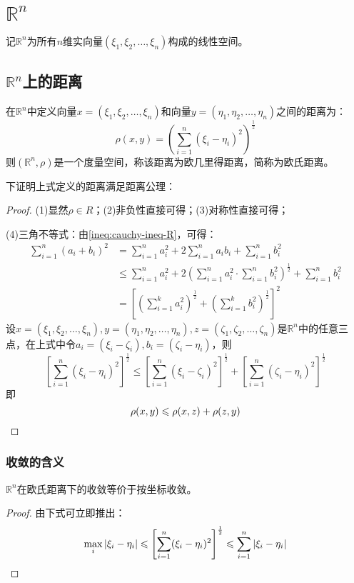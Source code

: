 \section{$\mathbb{R}^n$}

\begin{definition}
	记$\mathbb{R}^n$为所有$n$维实向量$(\xi_1,\xi_2,\dots,\xi_n)$构成的线性空间。
\end{definition}

\subsection{$\mathbb{R}^n$上的距离}
\begin{definition}
	在$\mathbb{R}^n$中定义向量$x=(\xi_1,\xi_2,\dots,\xi_n)$和向量$y=(\eta_1,\eta_2,\dots,\eta_n)$之间的距离为：
	\begin{equation*}
		\rho(x,y)=\left(\sum_{i=1}^n(\xi_i-\eta_i)^2\right)^{\frac{1}{2}}
	\end{equation*}
	则$(\mathbb{R}^n,\rho)$是一个度量空间，称该距离为欧几里得距离，简称为欧氏距离。
\end{definition}
下证明上式定义的距离满足距离公理：
\begin{proof}
	(1)显然$\rho\in R$；(2)非负性直接可得；(3)对称性直接可得；\par
	(4)三角不等式：由\cref{ineq:cauchy-ineq-R}，可得：
	\begin{align*}
		\sum_{i=1}^n(a_i+b_i)^2&=\sum_{i=1}^na_i^2+2\sum_{i=1}^na_ib_i+\sum_{i=1}^nb_i^2 \\
		&\leqslant\sum_{i=1}^na_i^2+2\left(\sum_{i=1}^na_i^2\cdot\sum_{i=1}^nb_i^2\right)^{\frac{1}{2}}+\sum_{i=1}^nb_i^2 \\
		&=\left[\left(\sum_{i=1}^ka_i^2\right)^{\frac{1}{2}}+\left(\sum_{i=1}^kb_i^2\right)^{\frac{1}{2}}\right]^2
	\end{align*}
	设$x=(\xi_1,\xi_2,\dots,\xi_n),y=(\eta_1,\eta_2,\dots,\eta_n),z=(\zeta_1,\zeta_2,\dots,\zeta_n)$是$\mathbb{R}^n$中的任意三点，在上式中令$a_i=(\xi_i-\zeta_i),b_i=(\zeta_i-\eta_i)$，则
	\begin{equation*}
		\left[\sum_{i=1}^n(\xi_i-\eta_i)^2\right]^{\frac{1}{2}}\leqslant	\left[\sum_{i=1}^n(\xi_i-\zeta_i)^2\right]^{\frac{1}{2}}+\left[\sum_{i=1}^n(\zeta_i-\eta_i)^2\right]^{\frac{1}{2}}
	\end{equation*}
	即
	\begin{equation*}
		\rho(x,y)\leqslant\rho(x,z)+\rho(z,y)\qedhere
	\end{equation*}
\end{proof}
\subsubsection{收敛的含义}
\begin{theorem}
	$\mathbb{R}^{n}$在欧氏距离下的收敛等价于按坐标收敛。
\end{theorem}
\begin{proof}
	由下式可立即推出：
	\begin{equation*}
		\max_i|\xi_i-\eta_i|\leqslant	\left[\sum_{i=1}^n(\xi_i-\eta_i)^2\right]^{\frac{1}{2}}\leqslant\sum_{i=1}^{n}|\xi_i-\eta_i|\qedhere
	\end{equation*}
\end{proof}

